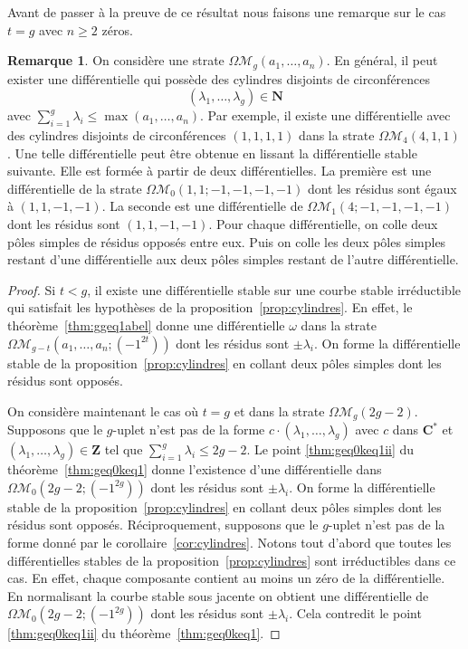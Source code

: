 \documentclass[11pt]{article}
\numberwithin{equation}{section}\renewcommand{\proofname}{Démonstration}
\let\mathcal\mathscr
\newcommand{\CC}{\mathbf{C}}
\newcommand{\NN}{\mathbf{N}}
\newcommand{\ZZ}{\mathbf{Z}}
\newcommand{\omoduli}[1][g]{{\Omega\mathcal M}_{\!#1}}
\theoremstyle{definition}
\newtheorem{rem}[thm]{Remarque}
\begin{document}
Avant de passer à la preuve de ce résultat nous faisons une remarque sur le cas $t=g$ avec $n\geq2$ zéros.
\begin{rem}
On considère une strate $\omoduli(a_{1},\dots,a_{n})$. En général, il peut exister une différentielle qui possède des cylindres disjoints de circonférences
\[
(\lambda_{1},\dots,\lambda_{g})\in \NN
\]
avec $\sum_{i=1}^{g} \lambda_{i} \leq \max (a_{1},\dots,a_{n})$. Par exemple, il existe une différentielle avec des cylindres disjoints de circonférences $(1,1,1,1)$ dans la strate $\omoduli[4](4,1,1)$. Une telle différentielle peut être obtenue en lissant la différentielle stable suivante. Elle est formée à partir de deux différentielles. La première est une différentielle de la strate $\omoduli[0](1,1;-1,-1,-1,-1)$ dont les résidus sont égaux à $(1,1,-1,-1)$. La seconde est une différentielle de $\omoduli[1](4;-1,-1,-1,-1)$ dont les résidus sont $(1,1,-1,-1)$. Pour chaque différentielle, on colle deux pôles simples de résidus opposés entre eux. Puis on colle les deux pôles simples restant d'une différentielle aux deux pôles simples restant de l'autre différentielle.
\end{rem}

\begin{proof}
Si $t<g$, il existe une différentielle stable sur une courbe stable irréductible qui satisfait les hypothèses de la proposition~\ref{prop:cylindres}. En effet, le théorème~\ref{thm:ggeq1abel} donne une différentielle $\omega$ dans la strate $\omoduli[g-t](a_{1},\dots,a_{n};(-1^{2t}))$ dont les résidus sont $\pm \lambda_{i}$. On forme la différentielle stable de la proposition~\ref{prop:cylindres} en collant deux pôles simples dont les résidus sont opposés.

On considère maintenant le cas où $t=g$ et dans la strate $\omoduli(2g-2)$. Supposons que le $g$-uplet n'est pas de la forme $c \cdot (\lambda_{1},\dots, \lambda_{g})$ avec $c$ dans $\CC^{\ast}$ et $(\lambda_{1},\dots,\lambda_{g})\in \ZZ$ tel que $\sum_{i=1}^{g} \lambda_{i} \leq 2g-2$. Le point \eqref{thm:geq0keq1ii} du théorème~\ref{thm:geq0keq1} donne l'existence d'une différentielle dans $\omoduli[0](2g-2;(-1^{2g}))$ dont les résidus sont $\pm \lambda_{i}$. On forme la différentielle stable de la proposition~\ref{prop:cylindres} en collant deux pôles simples dont les résidus sont opposés. Réciproquement, supposons que le $g$-uplet n'est pas de la forme donné par le corollaire~\ref{cor:cylindres}. Notons tout d'abord que toutes les différentielles stables de la proposition~\ref{prop:cylindres} sont irréductibles dans ce cas. En effet, chaque composante contient au moins un zéro de la différentielle. En normalisant la courbe stable sous jacente on obtient une différentielle de $\omoduli[0](2g-2;(-1^{2g}))$ dont les résidus sont $\pm \lambda_{i}$. Cela contredit le point \eqref{thm:geq0keq1ii} du théorème~\ref{thm:geq0keq1}.
\end{proof}
\end{document}
